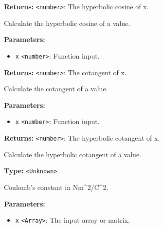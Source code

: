\documentclass[12pt,a4paper]{article}
\begin{document}
\noindent \textbf{Returns:} \texttt{<number>}: The hyperbolic cosine of x.

\noindent Calculate the hyperbolic cosine of a value.

\vspace{5mm}
\noindent {}


\noindent \textbf{Parameters:}
\begin{itemize}
  \item \texttt{x} \texttt{<number>}: Function input.
\end{itemize}

\noindent \textbf{Returns:} \texttt{<number>}: The cotangent of x.

\noindent Calculate the cotangent of a value.

\vspace{5mm}
\noindent {}


\noindent \textbf{Parameters:}
\begin{itemize}
  \item \texttt{x} \texttt{<number>}: Function input.
\end{itemize}

\noindent \textbf{Returns:} \texttt{<number>}: The hyperbolic cotangent of x.

\noindent Calculate the hyperbolic cotangent of a value.

\vspace{5mm}
\noindent {}\vspace{4mm}


\noindent \textbf{Type:} \texttt{<Unknown>}

\noindent Coulomb's constant in Nm\textasciicircum{}2/C\textasciicircum{}2.

\vspace{5mm}
\noindent {}


\noindent \textbf{Parameters:}
\begin{itemize}
  \item \texttt{x} \texttt{<Array>}: The input array or matrix.
\end{itemize}
\end{document}
